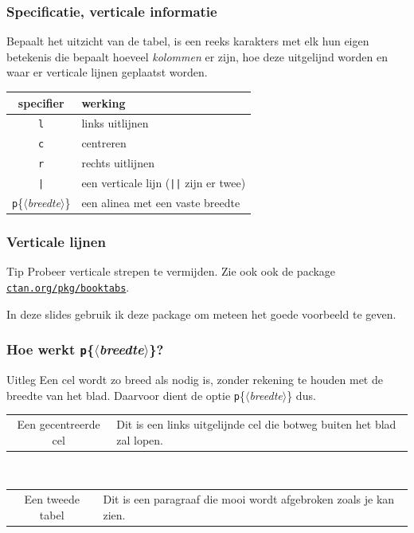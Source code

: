 \begin{frame}
  \frametitle{Specificatie, verticale informatie}

  Bepaalt het uitzicht van de tabel, is een reeks karakters met elk hun eigen betekenis die bepaalt hoeveel \emph{kolommen} er zijn, hoe deze uitgelijnd worden en waar er verticale lijnen geplaatst worden. \\[1em]

  \begin{tabular}{cl}
    specifier & werking \\\midrule
    \texttt{l} & links uitlijnen \\
    \texttt{c} & centreren \\
    \texttt{r} & rechts uitlijnen \\
    \texttt{|} & een verticale lijn (\texttt{||} zijn er twee) \\
    \texttt{p}\{$\langle$\textsl{breedte}$\rangle$\} & een alinea met een vaste breedte
  \end{tabular}
\end{frame}

\begin{frame}
  \frametitle{Verticale lijnen}

  \begin{alertblock}{Tip}
    Probeer verticale strepen te vermijden. Zie ook ook de package \href{http://ctan.org/pkg/booktabs}{\texttt{ctan.org/pkg/booktabs}}.
  \end{alertblock}

  In deze slides gebruik ik deze package om meteen het goede voorbeeld te geven.
\end{frame}

\begin{frame}
  \frametitle{Hoe werkt \texttt{p}\{$\langle$\textsl{breedte}$\rangle$\}?}

  \begin{exampleblock}{Uitleg}
  Een cel wordt zo breed als nodig is, zonder rekening te houden met de breedte van het blad. Daarvoor dient de optie \texttt{p}\{$\langle$\textsl{breedte}$\rangle$\} dus.
\end{exampleblock}

  \begin{tabular}{cl}
    Een gecentreerde cel & Dit is een links uitgelijnde cel die botweg buiten het blad zal lopen. \\
  \end{tabular} \\[1em]
  \begin{tabular}{cp{}}
    Een tweede tabel & Dit is een paragraaf die mooi wordt afgebroken zoals je kan zien. \\
  \end{tabular}
\end{frame}

